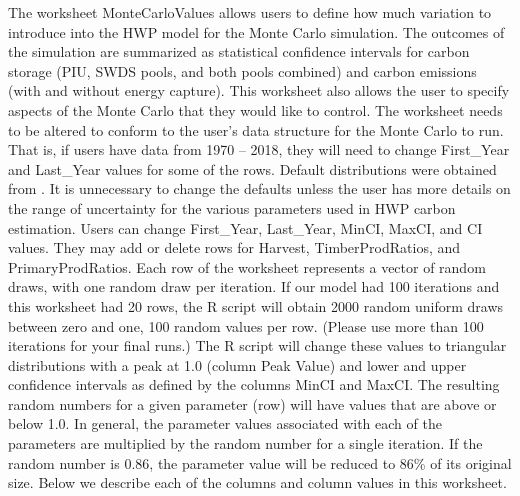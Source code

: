 \documentclass[
  openany]{book}
\begin{document}
The worksheet MonteCarloValues allows users to define how much variation to introduce into the HWP model for the Monte Carlo simulation. The outcomes of the simulation are summarized as statistical confidence intervals for carbon storage (PIU, SWDS pools, and both pools combined) and carbon emissions (with and without energy capture). This worksheet also allows the user to specify aspects of the Monte Carlo that they would like to control. The worksheet needs to be altered to conform to the user's data structure for the Monte Carlo to run. That is, if users have data from 1970 -- 2018, they will need to change First\_Year and Last\_Year values for some of the rows. Default distributions were obtained from \textcite{stockmann2012}. It is unnecessary to change the defaults unless the user has more details on the range of uncertainty for the various parameters used in HWP carbon estimation. Users can change First\_Year, Last\_Year, MinCI, MaxCI, and CI values. They may add or delete rows for Harvest, TimberProdRatios, and PrimaryProdRatios. Each row of the worksheet represents a vector of random draws, with one random draw per iteration. If our model had 100 iterations and this worksheet had 20 rows, the R script will obtain 2000 random uniform draws between zero and one, 100 random values per row. (Please use more than 100 iterations for your final runs.) The R script will change these values to triangular distributions with a peak at 1.0 (column Peak Value) and lower and upper confidence intervals as defined by the columns MinCI and MaxCI. The resulting random numbers for a given parameter (row) will have values that are above or below 1.0. In general, the parameter values associated with each of the parameters are multiplied by the random number for a single iteration. If the random number is 0.86, the parameter value will be reduced to 86\% of its original size. Below we describe each of the columns and column values in this worksheet.
\end{document}
